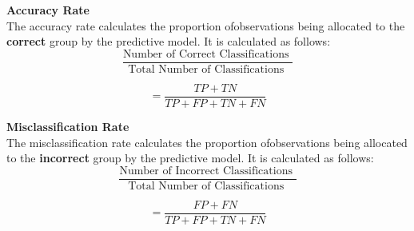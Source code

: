 \documentclass[]{report}
\begin{document}
\textbf{Accuracy Rate}\\
The accuracy rate calculates the proportion ofobservations being allocated to the \textbf{correct} group by the predictive model. It is calculated as follows:
\[ \frac{
\mbox{Number of Correct Classifications }}{\mbox{Total Number of Classifications }} \]

\[ = \frac{TP + TN}{TP+FP+TN+FN}\]

\medskip

\noindent \textbf{Misclassification Rate}\\
The misclassification rate calculates the proportion ofobservations being allocated to the \textbf{incorrect} group by the predictive model. It is calculated as follows:
\[ \frac{
\mbox{Number of Incorrect Classifications }}{\mbox{Total Number of Classifications }} \]

\[ = \frac{FP + FN}{TP+FP+TN+FN}\]
\newpage
\end{document}

